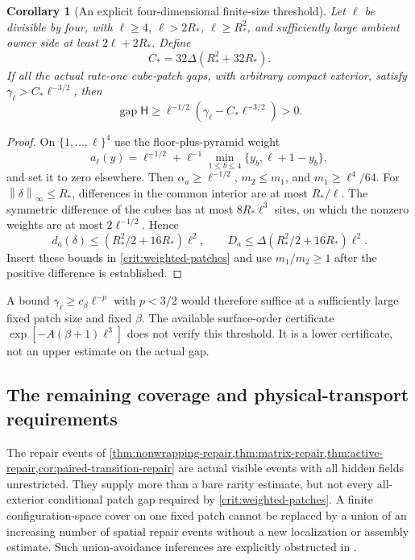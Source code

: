 \documentclass[11pt,oneside,openany]{book}
\newtheorem{corollary}[corollary]{Corollary}
\theoremstyle{definition}
\theoremstyle{remark}
\newcommand{\gap}{\operatorname{gap}}
\newcommand{\norm}[1]{\left\lVert#1\right\rVert}
\newcommand{\src}[2]{\cite[#2]{#1}}
\begin{document}
\begin{corollary}[An explicit four-dimensional finite-size threshold]
\label{cor:weighted-threshold}
Let $\ell$ be divisible by four, with
$\ell\ge4$, $\ell>2R_*$, $\ell\ge R_*^2$, and sufficiently large
ambient owner side at least $2\ell+2R_*$. Define
\[
 C_*=32\Delta(R_*^2+32R_*).
\]
If all the actual rate-one cube-patch gaps, with arbitrary compact
exterior, satisfy $\gamma_\ell>C_*\ell^{-3/2}$, then
\begin{equation}\label{eq:patch-explicit-floor}
 \gap\mathsf H\ge\ell^{-1/2}
                   (\gamma_\ell-C_*\ell^{-3/2})>0.
\end{equation}
\end{corollary}
\begin{proof}
On $\{1,\ldots,\ell\}^4$ use the floor-plus-pyramid weight
\[
 a_\ell(y)=\ell^{-1/2}
       +\ell^{-1}\min_{1\le b\le4}\{y_b,\ell+1-y_b\},
\]
and set it to zero elsewhere. Then $\alpha_a\ge\ell^{-1/2}$,
$m_2\le m_1$, and $m_1\ge\ell^4/64$. For
$\norm\delta_\infty\le R_*$, differences in the common interior
are at most $R_*/\ell$. The symmetric difference of the cubes has
at most $8R_*\ell^3$ sites, on which the nonzero weights are at most
$2\ell^{-1/2}$. Hence
\[
 d_a(\delta)\le(R_*^2/2+16R_*)\ell^2,
 \qquad D_a\le\Delta(R_*^2/2+16R_*)\ell^2.
\]
Insert these bounds in \cref{crit:weighted-patches} and use
$m_1/m_2\ge1$ after the positive difference is established.
\end{proof}
A bound $\gamma_\ell\ge c_\beta\ell^{-p}$ with $p<3/2$ would therefore
suffice at a sufficiently large fixed patch size and fixed $\beta$.
The available surface-order certificate
$\exp[-A(\beta+1)\ell^3]$ does not verify this threshold. It is a
lower certificate, not an upper estimate on the actual gap.

\subsection{The remaining coverage and physical-transport requirements}
The repair events of
\cref{thm:nonwrapping-repair,thm:matrix-repair,thm:active-repair,cor:paired-transition-repair}
are actual visible events with all hidden fields unrestricted. They
supply more than a bare rarity estimate, but not every all-exterior
conditional patch gap required by \cref{crit:weighted-patches}.
A finite configuration-space cover on one fixed patch cannot be
replaced by a union of an increasing number of spatial repair events
without a new localization or assembly estimate. Such union-avoidance
inferences are explicitly obstructed in \src{F12}{V79}.
\end{document}
